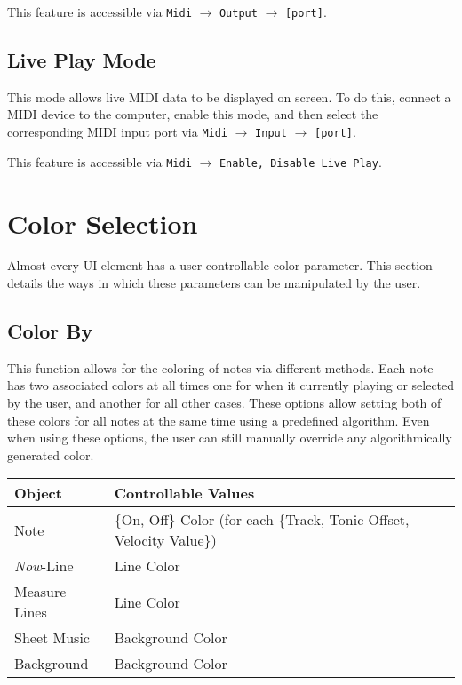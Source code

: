 \documentclass[english]{article}
\makeatletter
\newenvironment{restoretext}%
    {\@parboxrestore%
     \begin{adjustwidth}{}{\leftmargin}%
    }{\end{adjustwidth}
     }
\def\rcbegin{\begin{restoretext}\centering}
\def\rcend{\end{restoretext}}
\providecommand{\mi}[1]{\texttt{#1}}
\makeatother
\begin{document}
This feature is accessible via 
\mi{Midi} $\rightarrow$ \mi{Output} $\rightarrow$ \mi{[port]}.

\subsection{Live Play Mode}
\label{subsec:liveplay}

This mode allows live MIDI data to be displayed on screen. To do this, connect a MIDI device to the computer, enable
this mode, and then select the corresponding MIDI input port via 
\mi{Midi} $\rightarrow$ \mi{Input} $\rightarrow$ \mi{[port]}.

This feature is accessible via 
\mi{Midi} $\rightarrow$ \mi{{Enable, Disable} Live Play}.

\section{Color Selection}

Almost every UI element has a user-controllable color parameter. This section details the ways in which these
parameters can be manipulated by the user.

\subsection{Color By}

This function allows for the coloring of notes via different methods. Each note has two associated colors at all times
\textendash{} one for when it currently playing or selected by the user, and another for all other cases. These options allow
setting both of these colors for all notes at the same time using a predefined algorithm. Even when using these options,
the user can still manually override any algorithmically generated color.

\vspace{1em}

\rcbegin
\begin{tabular}{|l|l|}
  \hline
  \textbf{Object}           & \textbf{Controllable Values} \\
  \hline
  Note                    & \{On, Off\} Color (for each \{Track, Tonic Offset, Velocity Value\})\\
  \textit{Now}-Line       & Line Color \\
  Measure Lines           & Line Color \\
  Sheet Music             & Background Color \\
  Background              & Background Color \\
  \hline
\end{tabular}
\rcend
\end{document}
